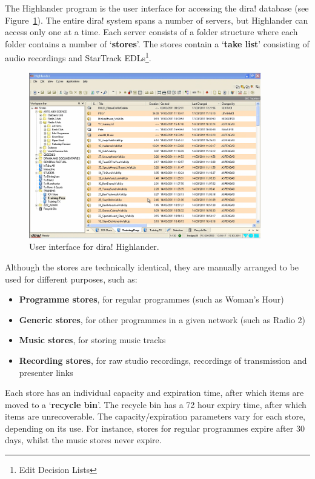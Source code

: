 The Highlander program is the user interface for accessing the dira! database
(see Figure~\ref{fig:highlander}). The entire dira! system spans a number of
servers, but Highlander can access only one at a time. Each server consists of
a folder structure where each folder contains a number of `\textbf{stores}'.
The stores contain a `\textbf{take list}' consisting of audio recordings and
StarTrack EDLs\footnote{Edit Decision Lists}.

\begin{figure}[p]
\centering
\includegraphics[width=0.9\textwidth]{figs/highlander-interface.png}
\caption{User interface for dira! Highlander.}
\label{fig:highlander}
\end{figure}

Although the stores are technically identical, they are manually arranged to be
used for different purposes, such as:
\begin{itemize}
  \item \textbf{Programme stores}, for regular programmes (such as Woman's
    Hour)
  \item \textbf{Generic stores}, for other programmes in a given network (such
    as Radio 2)
  \item \textbf{Music stores}, for storing music tracks
  \item \textbf{Recording stores}, for raw studio recordings, recordings of
    transmission and presenter links
\end{itemize}

Each store has an individual capacity and expiration time, after which items
are moved to a `\textbf{recycle bin}'. The recycle bin has a 72 hour expiry
time, after which items are unrecoverable. The capacity/expiration parameters
vary for each store, depending on its use. For instance, stores for regular
programmes expire after 30 days, whilst the music stores never expire.


